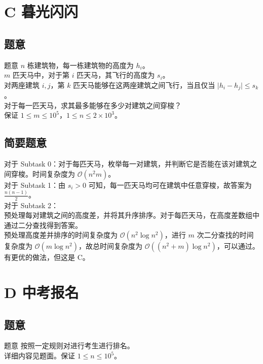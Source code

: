 \documentclass[11pt, fontset = fandol]{ctexbeamer}
\begin{document}
\section{C 暮光闪闪}
\subsection{题意}
\begin{frame}
  \begin{block}{题意}
  	$ n $ 栋建筑物，每一栋建筑物的高度为 $ h_i $。\\
  	$ m $ 匹天马中，对于第 $ i $ 匹天马，其飞行的高度为 $ s_i $。\\
  	对两座建筑 $i, j$，第 $k$ 匹天马能够在这两座建筑之间飞行，当且仅当 $\mid h_i - h_j \mid \le s_k$。\\
  	对于每一匹天马，求其最多能够在多少对建筑之间穿梭？\\
  	保证 $ 1 \le m \le 10^5$，$1 \le n \le 2 \times 10^3 $。
  \end{block}
\end{frame}

\subsection{简要题意}

\begin{frame}
\pause
对于 Subtask 0：对于每匹天马，枚举每一对建筑，并判断它是否能在该对建筑之间穿梭。时间复杂度为 $ \mathcal{O} \left(n^2m\right) $。\\
\pause
对于 Subtask 1：由 $ s_i > 0 $ 可知，每一匹天马均可在建筑中任意穿梭，故答案为 $ \frac{n(n - 1)}{2} $。\\
\pause
对于 Subtask 2：\\
\pause
预处理每对建筑之间的高度差，并将其升序排序。对于每匹天马，在高度差数组中通过二分查找得到答案。\\
\pause
预处理高度差并排序的时间复杂度为 $ \mathcal{O} \left(n^2 \log{n^2} \right) $，进行 $ m $ 次二分查找的时间复杂度为 $ \mathcal{O} \left(m \log{n^2} \right) $，故总时间复杂度为 $ \mathcal{O} \left(\left(n^2 + m\right) \log{n^2} \right) $，可以通过。\\
\pause
有更优的做法，但这是 C。
\end{frame}

\section{D 中考报名}

\subsection{题意}
\begin{frame}
  \begin{block}{题意}
    按照一定规则对进行考生进行排名。\\
    详细内容见题面。保证 $1 \le n \le {10} ^5$。
  \end{block}
\end{frame}
\end{document}
